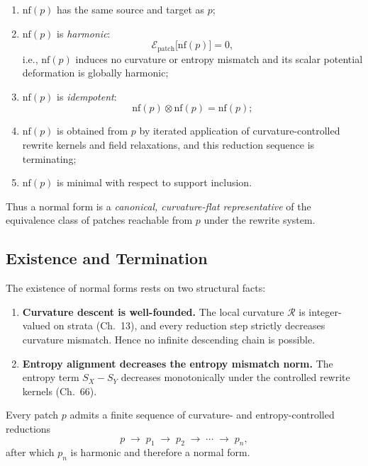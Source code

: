 \begin{enumerate}
\item $\mathrm{nf}(p)$ has the same source and target as $p$;

\item $\mathrm{nf}(p)$ is \emph{harmonic}:  
      \[
      \mathcal{E}_{\mathrm{patch}}\bigl[\mathrm{nf}(p)\bigr] = 0,
      \]
      i.e., $\mathrm{nf}(p)$ induces no curvature or entropy mismatch
      and its scalar potential deformation is globally harmonic;

\item $\mathrm{nf}(p)$ is \emph{idempotent}:  
      \[
      \mathrm{nf}(p) \otimes \mathrm{nf}(p) = \mathrm{nf}(p);
      \]

\item $\mathrm{nf}(p)$ is obtained from $p$ by iterated application
      of curvature-controlled rewrite kernels and field relaxations,
      and this reduction sequence is terminating;

\item $\mathrm{nf}(p)$ is minimal with respect to support inclusion.
\end{enumerate}

Thus a normal form is a \emph{canonical, curvature-flat representative}
of the equivalence class of patches reachable from $p$ under the rewrite system.

\subsection{Existence and Termination}
\label{subsec:79-3-termination}

The existence of normal forms rests on two structural facts:

\begin{enumerate}
\item \textbf{Curvature descent is well-founded.}  
      The local curvature $\mathcal{R}$ is integer-valued on strata (Ch.~13),
      and every reduction step strictly decreases curvature mismatch.
      Hence no infinite descending chain is possible.

\item \textbf{Entropy alignment decreases the entropy mismatch norm.}  
      The entropy term $S_X - S_Y$ decreases monotonically under
      the controlled rewrite kernels (Ch.~66).
\end{enumerate}

\begin{lemma}[Termination]
Every patch $p$ admits a finite sequence of curvature- and entropy-controlled
reductions
\[
p \;\longrightarrow\; p_1 \;\longrightarrow\; p_2 
  \;\longrightarrow\; \cdots \;\longrightarrow\; p_n,
\]
after which $p_n$ is harmonic and therefore a normal form.
\end{lemma}

